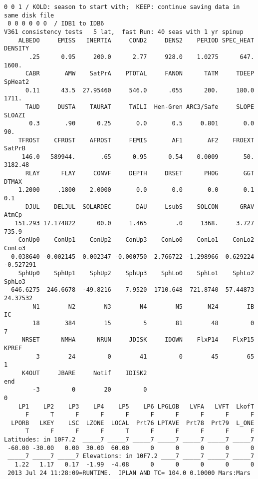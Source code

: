 \documentclass{article}
\begin{document}
\begin{verbatim}
0 0 1 / KOLD: season to start with;  KEEP: continue saving data in same disk file
 0 0 0 0 0 0  / IDB1 to IDB6
V361 consistency tests   5 lat,  fast Run: 40 seas with 1 yr spinup
    ALBEDO     EMISS   INERTIA     COND2     DENS2    PERIOD SPEC_HEAT   DENSITY
       .25      0.95     200.0      2.77     928.0    1.0275      647.     1600.
      CABR       AMW    SatPrA    PTOTAL     FANON      TATM     TDEEP   SpHeat2
      0.11      43.5  27.95460     546.0      .055      200.     180.0     1711.
      TAUD     DUSTA    TAURAT     TWILI  Hen-Gren ARC3/Safe     SLOPE    SLOAZI
       0.3       .90      0.25       0.0       0.5     0.801       0.0       90.
    TFROST    CFROST    AFROST     FEMIS       AF1       AF2    FROEXT    SatPrB
     146.0   589944.       .65      0.95      0.54    0.0009       50.   3182.48
      RLAY      FLAY     CONVF     DEPTH     DRSET      PHOG       GGT     DTMAX
    1.2000     .1800    2.0000       0.0       0.0       0.0       0.1       0.1
      DJUL    DELJUL  SOLARDEC       DAU     LsubS    SOLCON      GRAV     AtmCp
   151.293 17.174822      00.0     1.465        .0     1368.     3.727     735.9
    ConUp0    ConUp1    ConUp2    ConUp3    ConLo0    ConLo1    ConLo2    ConLo3
  0.038640 -0.002145  0.002347 -0.000750  2.766722 -1.298966  0.629224 -0.527291
    SphUp0    SphUp1    SphUp2    SphUp3    SphLo0    SphLo1    SphLo2    SphLo3
  646.6275  246.6678  -49.8216    7.9520  1710.648  721.8740  57.44873  24.37532
        N1        N2        N3        N4        N5       N24        IB        IC
        18       384        15         5        81        48         0         7
     NRSET      NMHA      NRUN     JDISK     IDOWN    FlxP14    FlxP15     KPREF
         3        24         0        41         0        45        65         1
     K4OUT     JBARE     Notif    IDISK2                                     end
        -3         0        20         0                                       0
    LP1    LP2    LP3    LP4    LP5    LP6 LPGLOB   LVFA   LVFT  LkofT
      F      T      F      F      F      F      F      F      F      F
  LPORB   LKEY    LSC  LZONE  LOCAL  Prt76 LPTAVE  Prt78  Prt79  L_ONE
      T      F      F      F      T      F      F      F      F      F
Latitudes: in 10F7.2  _____7 _____7 _____7 _____7 _____7 _____7 _____7
 -60.00 -30.00   0.00  30.00  60.00      0      0      0      0      0
 _____7 _____7 _____7 Elevations: in 10F7.2 ____7 _____7 _____7 _____7
   1.22   1.17   0.17  -1.99  -4.08      0      0      0      0      0
 2013 Jul 24 11:28:09=RUNTIME.  IPLAN AND TC= 104.0 0.10000 Mars:Mars

\end{verbatim}
\end{document}
